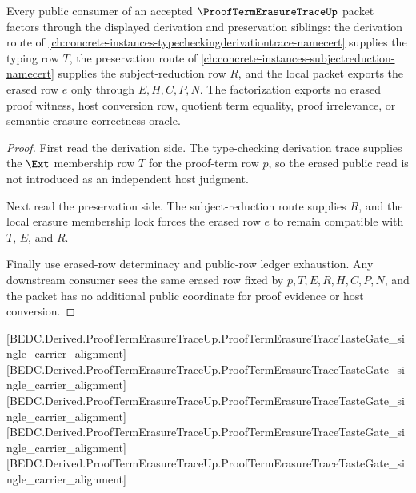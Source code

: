 \begin{theorem}
\label{thm:proof-term-erasure-trace-public-consumer-factorization}
Every public consumer of an accepted $\ProofTermErasureTraceUp$ packet factors through the displayed derivation and preservation siblings: the derivation route of \autoref{ch:concrete-instances-typecheckingderivationtrace-namecert} supplies the typing row $T$, the preservation route of \autoref{ch:concrete-instances-subjectreduction-namecert} supplies the subject-reduction row $R$, and the local packet exports the erased row $e$ only through $E,H,C,P,N$. The factorization exports no erased proof witness, host conversion row, quotient term equality, proof irrelevance, or semantic erasure-correctness oracle.
\end{theorem}
\begin{proof}
First read the derivation side. The type-checking derivation trace supplies the $\Ext$ membership row $T$ for the proof-term row $p$, so the erased public read is not introduced as an independent host judgment.

Next read the preservation side. The subject-reduction route supplies $R$, and the local erasure membership lock forces the erased row $e$ to remain compatible with $T$, $E$, and $R$.

Finally use erased-row determinacy and public-row ledger exhaustion. Any downstream consumer sees the same erased row fixed by $p,T,E,R,H,C,P,N$, and the packet has no additional public coordinate for proof evidence or host conversion.
\end{proof}

[BEDC.Derived.ProofTermErasureTraceUp.ProofTermErasureTraceTasteGate\_single\_carrier\_alignment]
[BEDC.Derived.ProofTermErasureTraceUp.ProofTermErasureTraceTasteGate\_single\_carrier\_alignment]
[BEDC.Derived.ProofTermErasureTraceUp.ProofTermErasureTraceTasteGate\_single\_carrier\_alignment]
[BEDC.Derived.ProofTermErasureTraceUp.ProofTermErasureTraceTasteGate\_single\_carrier\_alignment]
[BEDC.Derived.ProofTermErasureTraceUp.ProofTermErasureTraceTasteGate\_single\_carrier\_alignment]

